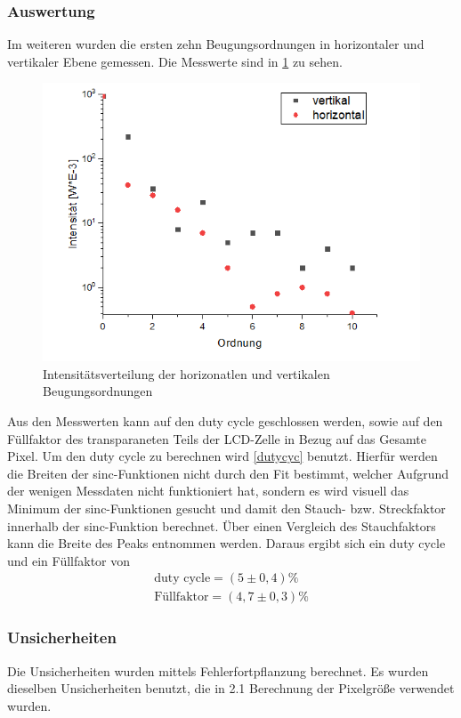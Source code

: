 \subsubsection{Auswertung}
Im weiteren wurden die ersten zehn Beugungsordnungen in horizontaler und vertikaler Ebene gemessen. Die Messwerte sind in \cref{horiz} zu sehen.
\begin{figure}[h!]
	\centering
	\includegraphics[scale = 1]{horizundvertik.png}
	\caption{Intensitätsverteilung der horizonatlen und vertikalen Beugungsordnungen}
	\label{horiz}
\end{figure}
Aus den Messwerten kann auf den duty cycle geschlossen werden, sowie auf den Füllfaktor des transparaneten Teils der LCD-Zelle in Bezug auf das Gesamte Pixel. Um den duty cycle zu berechnen wird \cref{dutycyc} benutzt. Hierfür werden die Breiten der sinc-Funktionen nicht durch den Fit bestimmt, welcher Aufgrund der wenigen Messdaten nicht funktioniert hat, sondern es wird visuell das Minimum der sinc-Funktionen gesucht und damit den Stauch- bzw. Streckfaktor innerhalb der sinc-Funktion berechnet. Über einen Vergleich des Stauchfaktors kann die Breite des Peaks entnommen werden.
Daraus ergibt sich ein duty cycle und ein Füllfaktor von 
\begin{align}
	\text{duty cycle} = (5 \pm 0,4)\% \\
	\text{Füllfaktor} = (4,7 \pm 0,3)\%
\end{align}
\subsubsection{Unsicherheiten}
Die Unsicherheiten wurden mittels Fehlerfortpflanzung berechnet. Es wurden dieselben Unsicherheiten benutzt, die in 2.1 Berechnung der Pixelgröße verwendet wurden.
